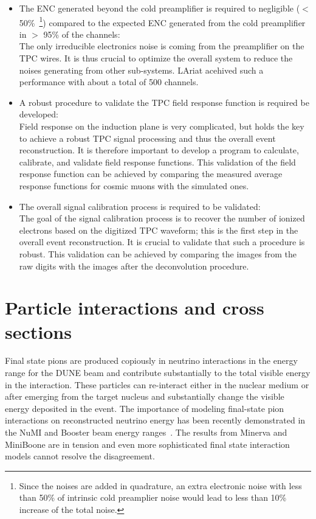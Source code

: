 \begin{itemize}
\item The ENC generated beyond the cold preamplifier is required to negligible ($<$ 50\%~\footnote{Since the 
noises are added in quadrature, an extra electronic noise with less than 50\% of intrinsic cold preamplier
noise would lead to less than 10\% increase of the total noise.}) compared to the 
expected ENC generated from the cold preamplifier in $>$ 95\% of the channels: \\
The only irreducible electronics noise is coming from the preamplifier on the TPC wires. It is thus
crucial to optimize the overall system to reduce the noises generating from other sub-systems. 
LAriat acehived such a performance with about a total of 500 channels. 
\item A robust procedure to validate the TPC field response function is required
be developed: \\
Field response on the induction plane is very complicated, but holds the key to achieve a robust TPC 
signal processing and thus the overall event reconstruction. It is therefore important to develop a 
program to calculate, calibrate, and validate field response functions. This validation of the field response function 
can be achieved by comparing the measured average response functions for cosmic muons with the simulated
ones. 
\item The overall signal calibration process is required to be validated: \\
The goal of the signal calibration process is to recover the number of ionized electrons based on
the digitized TPC waveform; this is the first step in the overall event reconstruction. It is crucial to 
validate that such a procedure is robust. This validation can be achieved by comparing the 
images from the raw digits with the images after the deconvolution procedure.
\end{itemize}




\section{Particle interactions and cross sections}



Final state pions are produced copiously in neutrino interactions in the energy range for the DUNE beam  and contribute 
substantially to the total visible energy in the interaction.
These particles can re-interact either in the nuclear medium or after emerging from the target nucleus
and substantially change the visible energy deposited in the event. 
The importance of modeling final-state pion interactions on reconstructed neutrino energy has 
been recently demonstrated in the NuMI and Booster beam energy ranges~\cite{miniboonefsi, minervafsi}. The results from Minerva and MiniBoone are in tension and even more sophisticated final state interaction models cannot resolve the disagreement.  

